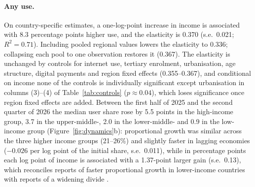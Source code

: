 \documentclass[11pt]{article}
\theoremstyle{definition}
\theoremstyle{remark}
\begin{document}
\paragraph{Any use.} On country-specific estimates, a one-log-point increase in income is associated with 8.3 percentage points higher use, and the elasticity is 0.370 (s.e.\ 0.021; $R^2 = 0.71$). Including pooled regional values lowers the elasticity to 0.336; collapsing each pool to one observation restores it (0.367). The elasticity is unchanged by controls for internet use, tertiary enrolment, urbanisation, age structure, digital payments and region fixed effects (0.355--0.367), and conditional on income none of the controls is individually significant except urbanisation in columns (3)--(4) of Table~\ref{tab:controls} ($p \approx 0.04$), which loses significance once region fixed effects are added. Between the first half of 2025 and the second quarter of 2026 the median user share rose by 5.5 points in the high-income group, 3.7 in the upper-middle-, 2.0 in the lower-middle- and 0.9 in the low-income group (Figure~\ref{fig:dynamics}b): proportional growth was similar across the three higher income groups (21--26\%) and slightly faster in lagging economies ($-0.026$ per log point of the initial share, s.e.\ 0.011), while in percentage points each log point of income is associated with a 1.37-point larger gain (s.e.\ 0.13), which reconciles reports of faster proportional growth in lower-income countries \citep{chatterji2025how} with reports of a widening divide \citep{microsoft2026h2,liu2025who}.
\end{document}
